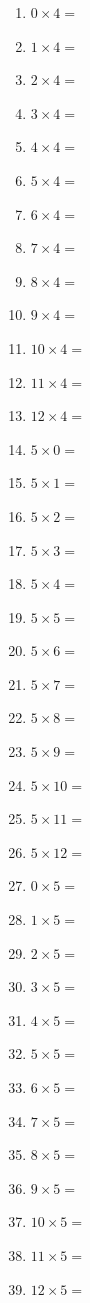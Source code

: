 \documentclass{article}
\begin{document}
\begin{multicols}{4}
\begin{enumerate}
\item $0 \times 4 =$
\item $1 \times 4 =$
\item $2 \times 4 =$
\item $3 \times 4 =$
\item $4 \times 4 =$
\item $5 \times 4 =$
\item $6 \times 4 =$
\item $7 \times 4 =$
\item $8 \times 4 =$
\item $9 \times 4 =$
\item $10 \times 4 =$
\item $11 \times 4 =$
\item $12 \times 4 =$

\item $5 \times 0 =$
\item $5 \times 1 =$
\item $5 \times 2 =$
\item $5 \times 3 =$
\item $5 \times 4 =$
\item $5 \times 5 =$
\item $5 \times 6 =$
\item $5 \times 7 =$
\item $5 \times 8 =$
\item $5 \times 9 =$
\item $5 \times 10 =$
\item $5 \times 11 =$
\item $5 \times 12 =$

\item $0 \times 5 =$
\item $1 \times 5 =$
\item $2 \times 5 =$
\item $3 \times 5 =$
\item $4 \times 5 =$
\item $5 \times 5 =$
\item $6 \times 5 =$
\item $7 \times 5 =$
\item $8 \times 5 =$
\item $9 \times 5 =$
\item $10 \times 5 =$
\item $11 \times 5 =$
\item $12 \times 5 =$


\end{enumerate}
\end{multicols}
\end{document}
